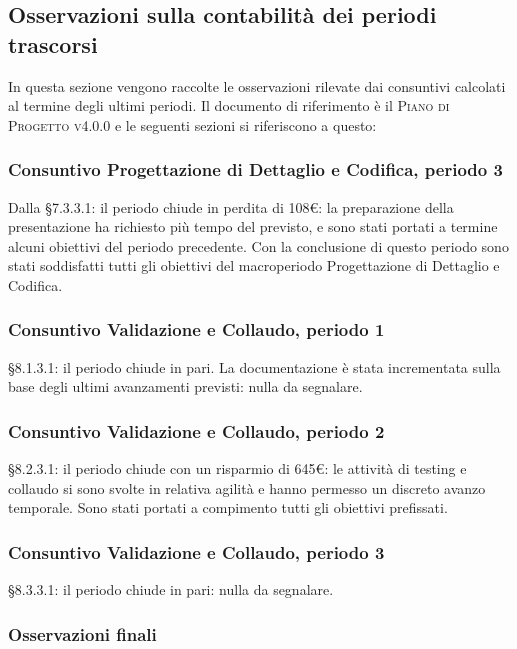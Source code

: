 \subsection{Osservazioni sulla contabilità dei periodi trascorsi}

In questa sezione vengono raccolte le osservazioni rilevate dai consuntivi calcolati al termine degli ultimi periodi. Il documento di riferimento è il \textsc{Piano di Progetto v4.0.0} e le seguenti sezioni si riferiscono a questo:

\subsubsection{Consuntivo Progettazione di Dettaglio e Codifica, periodo 3}

Dalla \S 7.3.3.1: il periodo chiude in perdita di 108\euro: la preparazione della presentazione ha richiesto più tempo del previsto, e sono stati portati a termine alcuni obiettivi del periodo precedente. Con la conclusione di questo periodo sono stati soddisfatti tutti gli obiettivi del macroperiodo Progettazione di Dettaglio e Codifica.

\subsubsection{Consuntivo Validazione e Collaudo, periodo 1}
\S 8.1.3.1: il periodo chiude in pari. La documentazione è stata incrementata sulla base degli ultimi avanzamenti previsti: nulla da segnalare.


\subsubsection{Consuntivo Validazione e Collaudo, periodo 2}

\S 8.2.3.1: il periodo chiude con un risparmio di 645\euro: le attività di testing e collaudo si sono svolte in relativa agilità e hanno permesso un discreto avanzo temporale. Sono stati portati a compimento tutti gli obiettivi prefissati.

\subsubsection{Consuntivo Validazione e Collaudo, periodo 3}

\S 8.3.3.1: il periodo chiude in pari: nulla da segnalare.

\subsubsection{Osservazioni finali}

